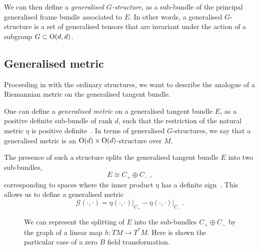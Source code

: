 \documentclass[debug]{phd}
\begin{document}
						We can then define a \emph{generalised $G$-structure}, as a sub-bundle of the principal generalised frame bundle associated to $E$.
						In other words, a generalised $G$-structure is a set of generalised tensors that are invariant under the action of a subgroup $G \subset \mathrm{O}(d,d)$.
					\subsection{Generalised metric}\label{genmetrOdd}
						Proceeding in with the ordinary structures, we want to describe the analogue of a Riemannian metric on the generalised tangent bundle.
						
						One can define a \emph{generalised metric} on a generalised tangent bundle $E$, as a positive definite sub-bundle of rank $d$, such that the restriction of the natural metric $\eta$ is positive definite~\cite[def. 4.1.1]{baraglia}.
						In terms of generalised $G$-structures, we say that a generalised metric is an $\mathrm{O}(d) \times \mathrm{O}(d)$-structure over $M$.
						
						The presence of such a structure splits the generalised tangent bundle $E$ into two sub-bundles,
								\begin{equation}
									E \cong C_+ \oplus C_- \, ,
								\end{equation}
						corresponding to spaces where the inner product $\eta$ has a definite sign~\cite{gualtphd, petrini3}. 	 
						This allows us to define a generalised metric~\cite{baraglia}
								\begin{equation}\label{Gmetr}
									\mathcal{G}(\cdot,\cdot) = \eta(\cdot,\cdot) \big|_{C_{+}} - \eta(\cdot,\cdot)\big|_{C_{-}} \, .
								\end{equation}
								\begin{figure}
								\centering
									
									\caption{We can represent the splitting of $E$ into the sub-bundles $C_{+} \oplus C_{-}$ by the graph of a linear map $h: TM \longrightarrow T^*M$. 
									Here is shown the particular case of a zero $B$ field transformation.}
									\label{graph}
								\end{figure}
							
\end{document}
